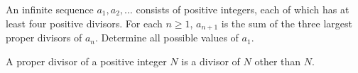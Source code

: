 An infinite sequence $a_1,a_2,\ldots$ consists of positive integers, each of which has at least four positive divisors. For each $n\geq 1$, $a_{n+1}$ is the sum of the three largest proper divisors of $a_n$. Determine all possible values of $a_1$.

A proper divisor of a positive integer $N$ is a divisor of $N$ other than $N$.

